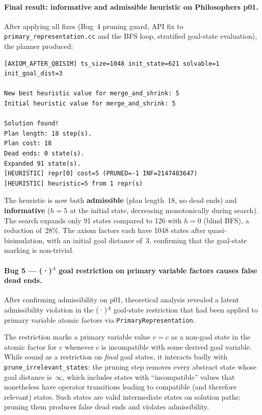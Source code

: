 \documentclass[11pt,a4paper]{article}
\begin{document}
\paragraph{Final result: informative and admissible heuristic on Philosophers p01.}

After applying all fixes (Bug~4 pruning guard, API fix to \texttt{primary\_representation.cc}
and the BFS loop, stratified goal-state evaluation), the planner produced:

\begin{lstlisting}
[AXIOM_AFTER_QBISIM] ts_size=1048 init_state=621 solvable=1 init_goal_dist=3

New best heuristic value for merge_and_shrink: 5
Initial heuristic value for merge_and_shrink: 5

Solution found!
Plan length: 18 step(s).
Plan cost: 18
Dead ends: 0 state(s).
Expanded 91 state(s).
[HEURISTIC] repr[0] cost=5 (PRUNED=-1 INF=2147483647)
[HEURISTIC] heuristic=5 from 1 repr(s)
\end{lstlisting}

The heuristic is now both \textbf{admissible} (plan length~18, no dead ends)
and \textbf{informative} ($h = 5$ at the initial state, decreasing
monotonically during search).  The search expands only 91 states compared to
126 with $h = 0$ (blind BFS), a reduction of~28\%.  The axiom factors each
have 1048 states after quasi-bisimulation, with an initial goal distance of~3,
confirming that the goal-state marking is non-trivial.

\paragraph{Bug 5 — (·)$^A$ goal restriction on primary variable factors causes false dead ends.}

After confirming admissibility on p01, theoretical analysis revealed a latent
admissibility violation in the (·)$^A$ goal-state restriction that had been applied
to primary variable atomic factors via \texttt{PrimaryRepresentation}.

The restriction marks a primary variable value $v = c$ as a non-goal state in the
atomic factor for $v$ whenever $c$ is incompatible with some derived goal variable.
While sound as a restriction on \emph{final} goal states, it interacts badly with
\texttt{prune\_irrelevant\_states}: the pruning step removes every abstract state
whose goal distance is~$\infty$, which includes states with ``incompatible'' values
that nonetheless have operator transitions leading to compatible (and therefore
relevant) states.  Such states are valid intermediate states on solution paths; pruning
them produces false dead ends and violates admissibility.
\end{document}
